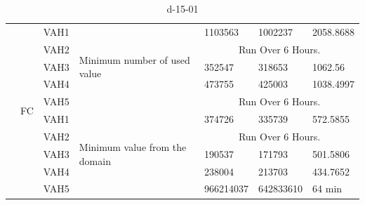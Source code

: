 \documentclass[14pt]{scrartcl} %
\begin{document}
\begin{table}[ht]
{\begin{tabular}{|l|l|l|l|l|l|l|}
                          & \multirow{10}{*}{FC} & VAH1 & \multirow{5}{*}{Minimum number of used value}  &  1103563      &    1002237         &      2058.8688       \\ \cline{3-3} \cline{5-7} 
                          &                      & VAH2 &                                                &       \multicolumn{3}{c|}{Run Over 6 Hours.}           \\ \cline{3-3} \cline{5-7} 
                          &                      & VAH3 &                                                &    352547    &      318653       &   1062.56    \\ \cline{3-3} \cline{5-7} 
                          &                      & VAH4 &                                                &   473755     &     425003        &          1038.4997   \\ \cline{3-3} \cline{5-7} 
                          &                      & VAH5 &                                                &      \multicolumn{3}{c|}{Run Over 6 Hours.}       \\ \cline{3-7} 
                          &                      & VAH1 & \multirow{5}{*}{Minimum value from the domain} &  374726      &    335739     &  572.5855           \\ \cline{3-3} \cline{5-7} 
                          &                      & VAH2 &                                                &        \multicolumn{3}{c|}{Run Over 6 Hours.}               \\ \cline{3-3} \cline{5-7} 
      \rowcolor{yellow}                      &                      & VAH3 &                                                &   190537     &        171793   &   501.5806        \\ \cline{3-3} \cline{5-7} 
 \rowcolor{green}                         &                      & VAH4 &                                                & 238004       &           213703  &     434.7652        \\ \cline{3-3} \cline{5-7} 
                          &                      & VAH5 &                        &   966214037    &  642833610   &   64 min \\ \hline
\end{tabular}
}
\caption{d-15-01}
\end{table}


\end{document}
